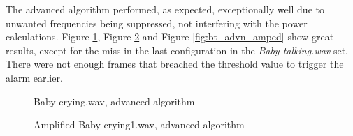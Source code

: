 The advanced algorithm performed, as expected, exceptionally well due to unwanted frequencies being suppressed, not interfering 
with the power calculations. Figure \ref{fig:bc1_advn}, Figure \ref{fig:bc2_advn_amped} and Figure \ref{fig:bt_advn_amped} show
great results, except for the miss in the last configuration in the \emph{Baby talking.wav} set. There were not enough frames that breached 
the threshold value to trigger the alarm earlier.

\begin{figure}[H]
  \centering
  \caption{Baby crying.wav, advanced algorithm}
  \label{fig:bc1_advn}
\end{figure}
\begin{figure}[H]
  \centering
  \caption{Amplified Baby crying1.wav, advanced algorithm}
  \label{fig:bc2_advn_amped}
\end{figure}
